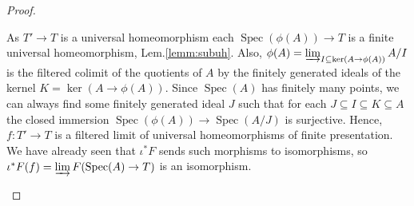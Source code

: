 \documentclass[10pt]{amsart}
\theoremstyle{definition}
\DeclareMathOperator{\Spec}{Spec}
\begin{document}
\begin{proof}
\begin{enumerate}
As $T' \to T$ is a universal homeomorphism each $\Spec(\phi(A)) \to T$ is a finite universal homeomorphism, Lem.\ref{lemm:subuh}. Also, $\phi(A) = \varinjlim_{I \subseteq \ker(A \to \phi(A))} A / I$ is the filtered colimit of the quotients of $A$ by the finitely generated ideals of the kernel $K = \ker(A \to \phi(A))$. Since $\Spec(A)$ has finitely many points, we can always find some finitely generated ideal $J$ such that for each $J \subseteq I \subseteq K \subseteq A$ the closed immersion $\Spec(\phi(A)) \to \Spec(A / J)$ is surjective. Hence, $f: T' \to T$ is a filtered limit of universal homeomorphisms of finite presentation. We have already seen that $\iota^*F$ sends such morphisms to isomorphisms, so $\iota^*F(f)  = \varinjlim F(\Spec(A) \to T)$ is an isomorphism. 
\end{enumerate}
\end{proof}




\end{document}
